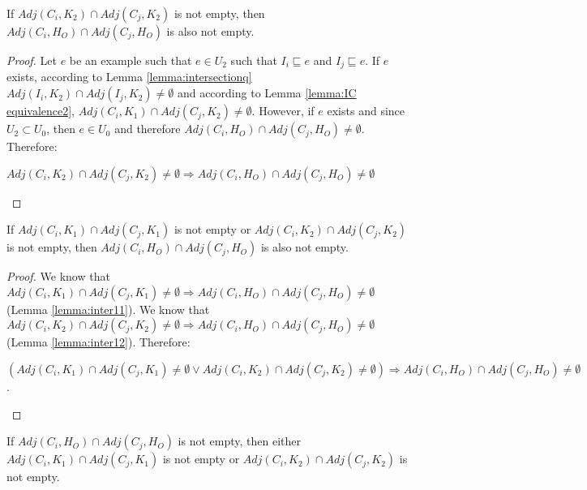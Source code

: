 \begin{lemma}\label{lemma:inter12}
If $Adj(C_{i}, K_{2}) \cap Adj(C_{j}, K_{2})$ is not empty, then $Adj(C_{i}, H_{O}) \cap Adj(C_{j}, H_{O})$ is also not empty.
\end{lemma}

\begin{proof}
Let $e$ be an example such that $e \in U_{2}$ such that $I_{i} \sqsubseteq e$ and $I_{j} \sqsubseteq e$. If $e$ exists, according to Lemma \ref{lemma:intersectionq} $Adj(I_{i}, K_{2}) \cap Adj(I_{j}, K_{2}) \neq \emptyset$ and according to Lemma \ref{lemma:IC equivalence2}, $Adj(C_{i}, K_{1}) \cap Adj(C_{j}, K_{2}) \neq \emptyset$. However, if $e$ exists and since $U_{2} \subset U_{0}$, then $e \in U_{0}$ and therefore $Adj(C_{i}, H_{O}) \cap Adj(C_{j}, H_{O}) \neq \emptyset$. Therefore:

\begin{center}
$Adj(C_{i}, K_{2}) \cap Adj(C_{j}, K_{2}) \neq \emptyset \Rightarrow Adj(C_{i}, H_{O}) \cap Adj(C_{j}, H_{O}) \neq \emptyset$
\end{center}
\end{proof}

\begin{lemma}\label{lemma:inter1}
If $Adj(C_{i}, K_{1}) \cap Adj(C_{j}, K_{1})$ is not  empty or $Adj(C_{i}, K_{2}) \cap Adj(C_{j}, K_{2})$ is not empty, then $Adj(C_{i}, H_{O}) \cap Adj(C_{j}, H_{O})$ is also not empty.
\end{lemma}

\begin{proof}
We know that $Adj(C_{i}, K_{1}) \cap Adj(C_{j}, K_{1}) \neq \emptyset \Rightarrow Adj(C_{i}, H_{O}) \cap Adj(C_{j}, H_{O}) \neq \emptyset$ (Lemma \ref{lemma:inter11}).
We know that $Adj(C_{i}, K_{2}) \cap Adj(C_{j}, K_{2}) \neq \emptyset \Rightarrow Adj(C_{i}, H_{O}) \cap Adj(C_{j}, H_{O}) \neq \emptyset$ (Lemma \ref{lemma:inter12}).
Therefore:

\begin{center}
$(Adj(C_{i}, K_{1}) \cap Adj(C_{j}, K_{1}) \neq \emptyset \vee Adj(C_{i}, K_{2}) \cap Adj(C_{j}, K_{2}) \neq \emptyset) \Rightarrow Adj(C_{i}, H_{O}) \cap Adj(C_{j}, H_{O}) \neq \emptyset$.
\end{center}
\end{proof}

\begin{lemma}\label{lemma:inter2}
If $Adj(C_{i}, H_{O}) \cap Adj(C_{j}, H_{O})$ is not empty, then either $Adj(C_{i}, K_{1}) \cap Adj(C_{j}, K_{1})$ is not empty or $Adj(C_{i}, K_{2}) \cap Adj(C_{j}, K_{2})$ is not empty.
\end{lemma}

